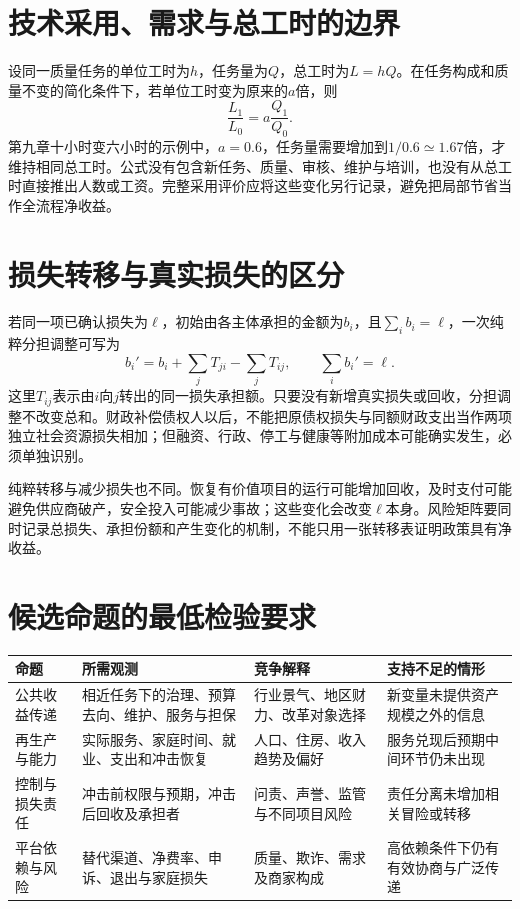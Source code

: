 \documentclass[UTF8,fontset=fandol,zihao=-4,oneside,openany]{ctexbook}
\begin{document}
\section{技术采用、需求与总工时的边界}
设同一质量任务的单位工时为$h$，任务量为$Q$，总工时为$L=hQ$。在任务构成和质量不变的简化条件下，若单位工时变为原来的$a$倍，则
\[
\frac{L_1}{L_0}=a\frac{Q_1}{Q_0}.
\]
第九章十小时变六小时的示例中，$a=0.6$，任务量需要增加到$1/0.6\simeq1.67$倍，才维持相同总工时。公式没有包含新任务、质量、审核、维护与培训，也没有从总工时直接推出人数或工资。完整采用评价应将这些变化另行记录，避免把局部节省当作全流程净收益。

\section{损失转移与真实损失的区分}
若同一项已确认损失为$\ell$，初始由各主体承担的金额为$b_i$，且$\sum_i b_i=\ell$，一次纯粹分担调整可写为
\[
b_i'=b_i+\sum_j T_{ji}-\sum_j T_{ij},\qquad
\sum_i b_i'=\ell.
\]
这里$T_{ij}$表示由$i$向$j$转出的同一损失承担额。只要没有新增真实损失或回收，分担调整不改变总和。财政补偿债权人以后，不能把原债权损失与同额财政支出当作两项独立社会资源损失相加；但融资、行政、停工与健康等附加成本可能确实发生，必须单独识别。

纯粹转移与减少损失也不同。恢复有价值项目的运行可能增加回收，及时支付可能避免供应商破产，安全投入可能减少事故；这些变化会改变$\ell$本身。风险矩阵要同时记录总损失、承担份额和产生变化的机制，不能只用一张转移表证明政策具有净收益。

\section{候选命题的最低检验要求}
\begin{longtable}{p{}p{}p{}p{}}
\toprule 命题 & 所需观测 & 竞争解释 & 支持不足的情形\\\midrule\endhead
公共收益传递 & 相近任务下的治理、预算去向、维护、服务与担保 & 行业景气、地区财力、改革对象选择 & 新变量未提供资产规模之外的信息\\
再生产与能力 & 实际服务、家庭时间、就业、支出和冲击恢复 & 人口、住房、收入趋势及偏好 & 服务兑现后预期中间环节仍未出现\\
控制与损失责任 & 冲击前权限与预期，冲击后回收及承担者 & 问责、声誉、监管与不同项目风险 & 责任分离未增加相关冒险或转移\\
平台依赖与风险 & 替代渠道、净费率、申诉、退出与家庭损失 & 质量、欺诈、需求及商家构成 & 高依赖条件下仍有有效协商与广泛传递\\
\bottomrule
\end{longtable}
\end{document}
